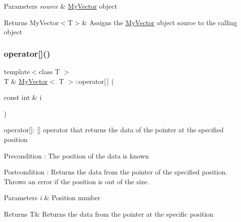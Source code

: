\begin{DoxyParams}{Parameters}
{\em source} & \mbox{\hyperlink{class_my_vector}{My\+Vector}} object \\
\hline
\end{DoxyParams}
\begin{DoxyReturn}{Returns}
My\+Vector$<$\+T$>$\& Assigns the \mbox{\hyperlink{class_my_vector}{My\+Vector}} object source to the calling object 
\end{DoxyReturn}
\mbox{\label{class_my_vector_a52eca35ed558d978bf5a8541f9d0115c}} 
\subsubsection{\texorpdfstring{operator[]()}{operator[]()}\hspace{0.1cm}{\footnotesize\ttfamily [1/2]}}
{\footnotesize\ttfamily template$<$class T $>$ \\
T \& \mbox{\hyperlink{class_my_vector}{My\+Vector}}$<$ T $>$\+::operator\mbox{[}$\,$\mbox{]} (\begin{DoxyParamCaption}\item[{const int \&}]{i }\end{DoxyParamCaption})}



operator\mbox{[}\mbox{]}\+: \mbox{[}\mbox{]} operator that returns the data of the pointer at the specified position 

\begin{DoxyPrecond}{Precondition}
\+: The position of the data is known 
\end{DoxyPrecond}
\begin{DoxyPostcond}{Postcondition}
\+: Returns the data from the pointer of the specified position. Throws an error if the position is out of the size. 
\end{DoxyPostcond}

\begin{DoxyParams}{Parameters}
{\em i} & Position number \\
\hline
\end{DoxyParams}
\begin{DoxyReturn}{Returns}
T\& Returns the data from the pointer at the specific position 
\end{DoxyReturn}
\mbox{\label{class_my_vector_a01d48c27ba17ad15aa29b2f039c303cd}} 
